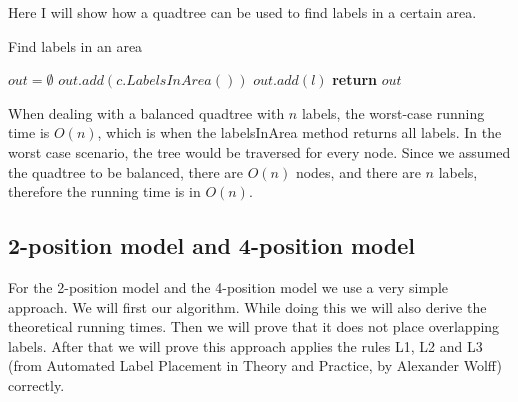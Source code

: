 \documentclass[crop=false,a4paper,oneside,11pt]{article}
\begin{document}
Here I will show how a quadtree can be used to find labels in a certain area.\\
\begin{algorithm}[H]
\caption{Find labels in an area}
\begin{algorithmic}[1]
\State $out = \emptyset$
\State $out.add(c.LabelsInArea())$
\EndIf
\EndFor
\Else{}
\State $out.add(l)$
\EndIf
\EndFor
\EndIf
\State \textbf{return} $out$
\EndProcedure
\end{algorithmic}
\end{algorithm}

When dealing with a balanced quadtree with $n$ labels, the worst-case running time is $O(n)$, which is when the labelsInArea method returns all labels. In the worst case scenario, the tree would be traversed for every node. Since we assumed the quadtree to be balanced, there are $O(n)$ nodes, and there are $n$ labels, therefore the running time is in $O(n)$.

\subsection{2-position model and 4-position model}
For the 2-position model and the 4-position model we use a very simple approach. We will first our algorithm. While doing this we will also derive the theoretical running times. Then we will prove that it does not place overlapping labels. After that we will prove this approach applies the rules L1, L2 and L3 (from Automated Label Placement in Theory and Practice, by Alexander Wolff) correctly.
\end{document}
